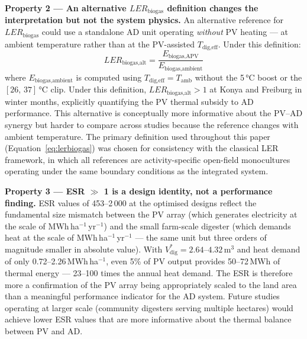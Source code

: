 \textbf{Property 2 --- An alternative $LER_{\text{biogas}}$
	definition changes the interpretation but not the system physics.}
An alternative reference for $LER_{\text{biogas}}$ could use a
standalone AD unit operating \textit{without} PV heating --- at
ambient temperature rather than at the PV-assisted
$T_{\text{dig,eff}}$. Under this definition:
\begin{equation}
	LER_{\text{biogas,alt}} =
	\frac{E_{\text{biogas,APV}}}{E_{\text{biogas,ambient}}}
	\label{eq:lerbiogas_alt}
\end{equation}
where $E_{\text{biogas,ambient}}$ is computed using
$T_{\text{dig,eff}} = T_{\text{amb}}$ without the 5\,\si{\celsius}
boost or the $[26,\,37]$\,\si{\celsius} clip. Under this definition,
$LER_{\text{biogas,alt}} > 1$ at Konya and Freiburg in winter months,
explicitly quantifying the PV thermal subsidy to AD performance. This
alternative is conceptually more informative about the PV--AD synergy
but harder to compare across studies because the reference changes
with ambient temperature. The primary definition used throughout this
paper (Equation~\ref{eq:lerbiogas}) was chosen for consistency with
the classical LER framework, in which all references are
activity-specific open-field monocultures operating under the same
boundary conditions as the integrated system.

\textbf{Property 3 --- ESR $\gg$ 1 is a design identity, not a
	performance finding.}
ESR values of 453--2\,000 at the optimised designs reflect the
fundamental size mismatch between the PV array (which generates
electricity at the scale of MWh\,ha$^{-1}$\,yr$^{-1}$) and the
small farm-scale digester (which demands heat at the scale of
MWh\,ha$^{-1}$\,yr$^{-1}$ --- the same unit but three orders of
magnitude smaller in absolute value). With $V_{\text{dig}}^* =
2.64$--$4.32$\,m$^3$ and heat demand of only
0.72--2.26\,MWh\,ha$^{-1}$, even 5\% of PV output provides
50--72\,MWh of thermal energy --- 23--100 times the annual heat
demand. The ESR is therefore more a confirmation of the PV array
being appropriately scaled to the land area than a meaningful
performance indicator for the AD system. Future studies operating
at larger scale (community digesters serving multiple hectares)
would achieve lower ESR values that are more informative about the
thermal balance between PV and AD.

